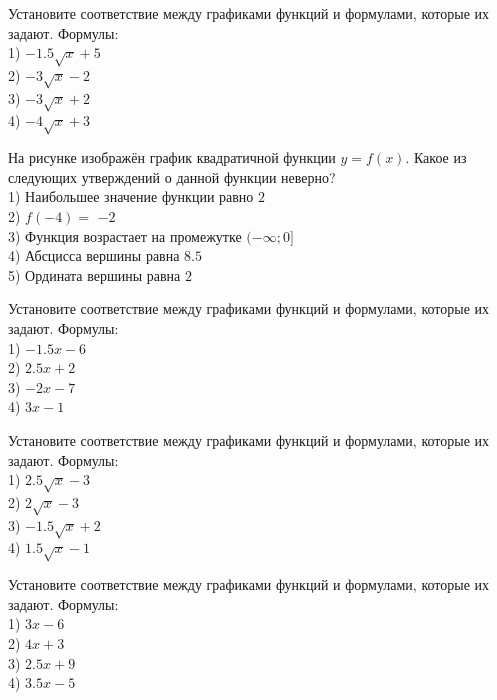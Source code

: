 \documentclass[4apaper]{article}
\begin{document}
\begin{taskBN}{6}
Установите соответствие между графиками функций и формулами, которые их задают. Формулы: \\1) $-1.5\sqrt{x}+5$\\2) $-3\sqrt{x}-2$\\3) $-3\sqrt{x}+2$\\4) $-4\sqrt{x}+3$
\end{taskBN}

\begin{taskBN}{7}
На рисунке изображён график квадратичной функции $y=f(x)$. Какое из следующих утверждений о данной функции неверно?\\1) Наибольшее значение функции равно  $2$\\2) $f(-4)=$ $-2$\\3) Функция возрастает на промежутке $(-\infty;0]$\\4) Абсцисса вершины равна $8.5$\\5) Ордината вершины равна $2$
\end{taskBN}

\begin{taskBN}{8}
Установите соответствие между графиками функций и формулами, которые их задают. Формулы: \\1) $-1.5x-6$\\2) $2.5x+2$\\3) $-2x-7$\\4) $3x-1$
\end{taskBN}

\begin{taskBN}{9}
Установите соответствие между графиками функций и формулами, которые их задают. Формулы: \\1) $2.5\sqrt{x}-3$\\2) $2\sqrt{x}-3$\\3) $-1.5\sqrt{x}+2$\\4) $1.5\sqrt{x}-1$
\end{taskBN}

\begin{taskBN}{10}
Установите соответствие между графиками функций и формулами, которые их задают. Формулы: \\1) $3x-6$\\2) $4x+3$\\3) $2.5x+9$\\4) $3.5x-5$
\end{taskBN}
\end{document}
